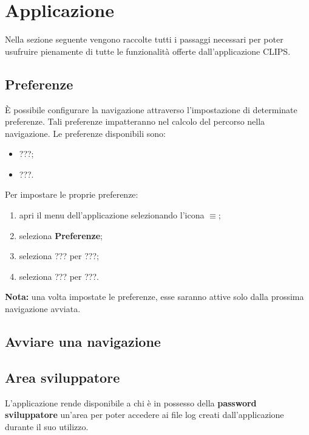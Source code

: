 \documentclass[../ClipsManualeUtente.tex]{subfiles}
\begin{document}
\section{Applicazione}
	Nella sezione seguente vengono raccolte tutti i passaggi necessari per poter usufruire pienamente di tutte le funzionalità offerte dall'applicazione CLIPS.
	
	\newpage
	\subsection{Preferenze}
		È possibile configurare la navigazione attraverso l'impostazione di determinate preferenze. Tali preferenze impatteranno nel calcolo del percorso nella navigazione.
		Le preferenze disponibili sono:
			\begin{itemize}
				\item ???;
				\item ???.
			\end{itemize}
		
		Per impostare le proprie preferenze:
		\begin{enumerate}
			\item apri il menu dell'applicazione selezionando l'icona $\equiv$;
			\item seleziona \textbf{Preferenze};
			\item seleziona ??? per ???;
			\item seleziona ??? per ???.
		\end{enumerate}

	\textbf{Nota:} una volta impostate le preferenze, esse saranno attive solo dalla prossima navigazione avviata.
	
	
	\newpage
	\subsection{Avviare una navigazione}
		
	\newpage
	\subsection{Area sviluppatore}
		L'applicazione rende disponibile a chi è in possesso della \textbf{password sviluppatore} un'area per poter accedere ai file log creati dall'applicazione durante il suo utilizzo.
		
\end{document}
